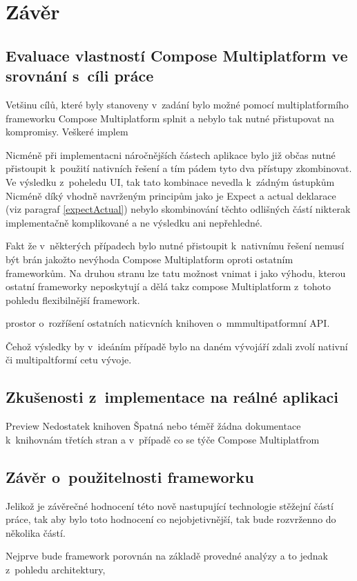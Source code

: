 \chapter{Závěr}

\section{Evaluace vlastností Compose Multiplatform ve srovnání s~cíli práce}
Vetšinu cílů, které byly stanoveny v~zadání bylo možné pomocí multiplatformího frameworku Compose Multiplatform splnit a nebylo tak
nutné přistupovat na kompromisy. Veškeré implem

Nicméně při implementacni náročnějších částech aplikace bylo již občas nutné přistoupit k~použití nativních řešení a tím pádem tyto dva přístupy zkombinovat.
Ve výsledku z~poheledu UI, tak tato kombinace nevedla k~zádným ústupkům
Nicméně díký vhodně navrženým principům jako je Expect a actual deklarace (viz paragraf \ref{expectActual}) nebylo skombinování těchto odlišných částí nikterak
implementačně komplikované a ne výsledku ani nepřehledné. 

Fakt že v~některých případech bylo nutné přistoupit k~nativnímu řešení nemusí být brán jakožto nevýhoda Compose Multiplatform oproti ostatním frameworkům.
Na druhou stranu lze tatu možnost vnimat i jako výhodu, kterou ostatní frameworky neposkytují a dělá takz compose Multiplatform z~tohoto pohledu flexibilnější
framework.

prostor o~rozříšení ostatních naticvních knihoven o~mmmultipatformní API. 

Čehož výsledky by v~ideáním případě bylo na daném vývojáří zdali zvolí nativní či multipaltformí cetu vývoje. 

\section{Zkušenosti z~implementace na reálné aplikaci}
Preview
Nedostatek knihoven
Špatná nebo téměř žádna dokumentace k~knihovnám třetích stran a v~případě co se týče Compose Multiplatfrom
\section{Závěr o~použitelnosti frameworku}
Jelikož je závěrečné hodnocení této nově nastupující technologie stěžejní částí práce, tak aby bylo toto hodnocení co 
nejobjetivnější, tak bude rozvrženno do několika částí.

Nejprve bude framework porovnán na základě provedné analýzy a to jednak z~pohledu architektury, 

